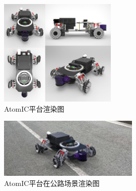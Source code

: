 \begin{figure}[H]
	\centering
	\includegraphics[width = 0.5\textwidth]{fig/xcsst.png}
	\caption{AtomIC平台渲染图}
	\label{xcsst}
\end{figure}

\begin{figure}[H]
	\centering
	\includegraphics[width = 0.6\textwidth]{fig/jdgonglu.jpg}
	\caption{AtomIC平台在公路场景渲染图}
	\label{jdgonglu}
\end{figure}

